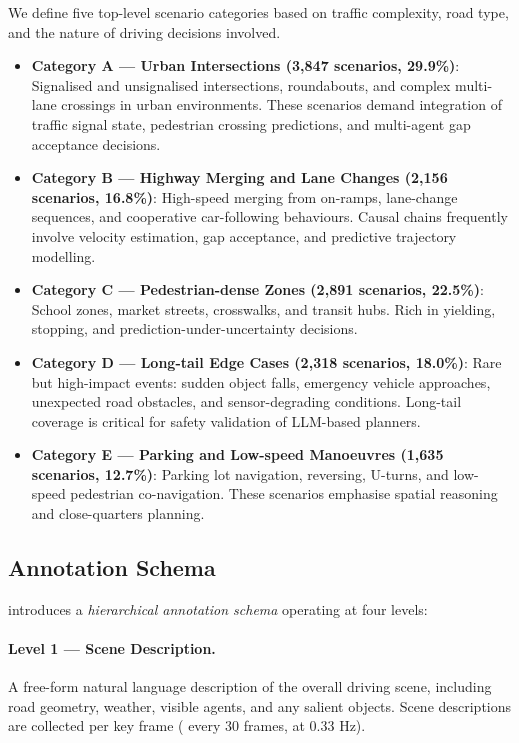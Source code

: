 We define five top-level scenario categories based on traffic complexity, road type,
and the nature of driving decisions involved.

\begin{itemize}[leftmargin=2em, noitemsep]
  \item \textbf{Category A --- Urban Intersections (3,847 scenarios, 29.9\%)}: Signalised
        and unsignalised intersections, roundabouts, and complex multi-lane crossings
        in urban environments. These scenarios demand integration of traffic signal state,
        pedestrian crossing predictions, and multi-agent gap acceptance decisions.
  \item \textbf{Category B --- Highway Merging and Lane Changes (2,156 scenarios, 16.8\%)}:
        High-speed merging from on-ramps, lane-change sequences, and cooperative
        car-following behaviours. Causal chains frequently involve velocity estimation,
        gap acceptance, and predictive trajectory modelling.
  \item \textbf{Category C --- Pedestrian-dense Zones (2,891 scenarios, 22.5\%)}: School
        zones, market streets, crosswalks, and transit hubs. Rich in yielding, stopping,
        and prediction-under-uncertainty decisions.
  \item \textbf{Category D --- Long-tail Edge Cases (2,318 scenarios, 18.0\%)}: Rare but
        high-impact events: sudden object falls, emergency vehicle approaches, unexpected
        road obstacles, and sensor-degrading conditions. Long-tail coverage is critical for
        safety validation of LLM-based planners.
  \item \textbf{Category E --- Parking and Low-speed Manoeuvres (1,635 scenarios, 12.7\%)}:
        Parking lot navigation, reversing, U-turns, and low-speed pedestrian co-navigation.
        These scenarios emphasise spatial reasoning and close-quarters planning.
\end{itemize}

\subsection{Annotation Schema}
\label{ssec:annotation_schema}

\lucid{} introduces a \emph{hierarchical annotation schema} operating at four levels:

\paragraph{Level 1 --- Scene Description.}
A free-form natural language description of the overall driving scene, including
road geometry, weather, visible agents, and any salient objects. Scene descriptions
are collected per key frame (\ie{} every 30 frames, at 0.33 Hz).

